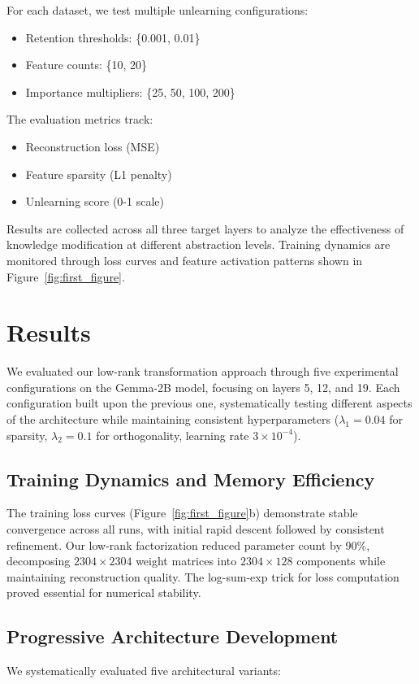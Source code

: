\documentclass{article} %
\begin{document}
For each dataset, we test multiple unlearning configurations:
\begin{itemize}
    \item Retention thresholds: \{0.001, 0.01\}
    \item Feature counts: \{10, 20\}
    \item Importance multipliers: \{25, 50, 100, 200\}
\end{itemize}

The evaluation metrics track:
\begin{itemize}
    \item Reconstruction loss (MSE)
    \item Feature sparsity (L1 penalty)
    \item Unlearning score (0-1 scale)
\end{itemize}

Results are collected across all three target layers to analyze the effectiveness of knowledge modification at different abstraction levels. Training dynamics are monitored through loss curves and feature activation patterns shown in Figure~\ref{fig:first_figure}.

\section{Results}
\label{sec:results}

We evaluated our low-rank transformation approach through five experimental configurations on the Gemma-2B model, focusing on layers 5, 12, and 19. Each configuration built upon the previous one, systematically testing different aspects of the architecture while maintaining consistent hyperparameters ($\lambda_1 = 0.04$ for sparsity, $\lambda_2 = 0.1$ for orthogonality, learning rate $3 \times 10^{-4}$).

\subsection{Training Dynamics and Memory Efficiency}
The training loss curves (Figure~\ref{fig:first_figure}b) demonstrate stable convergence across all runs, with initial rapid descent followed by consistent refinement. Our low-rank factorization reduced parameter count by 90\%, decomposing $2304 \times 2304$ weight matrices into $2304 \times 128$ components while maintaining reconstruction quality. The log-sum-exp trick for loss computation proved essential for numerical stability.

\subsection{Progressive Architecture Development}
We systematically evaluated five architectural variants:
\end{document}
